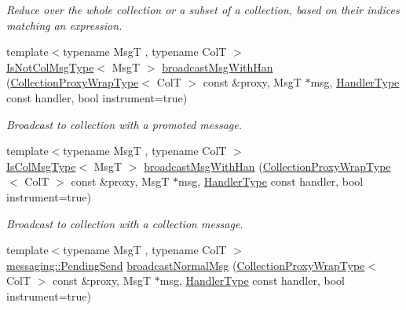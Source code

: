 \begin{DoxyCompactItemize}
\begin{DoxyCompactList}\small\item\em Reduce over the whole collection or a subset of a collection, based on their indices matching an expression. \end{DoxyCompactList}\item 
{\footnotesize template$<$typename MsgT , typename ColT $>$ }\\\hyperlink{structvt_1_1vrt_1_1collection_1_1_collection_manager_ae376deeefd4f89a0b1c93849977715d9}{Is\+Not\+Col\+Msg\+Type}$<$ MsgT $>$ \hyperlink{structvt_1_1vrt_1_1collection_1_1_collection_manager_a3b84dab30f231cc9a266ff323340f17e}{broadcast\+Msg\+With\+Han} (\hyperlink{structvt_1_1vrt_1_1collection_1_1_collection_manager_a56458ed7f9bb22b631b9b3a745f42f94}{Collection\+Proxy\+Wrap\+Type}$<$ ColT $>$ const \&proxy, MsgT $\ast$msg, \hyperlink{namespacevt_af64846b57dfcaf104da3ef6967917573}{Handler\+Type} const handler, bool instrument=true)
\begin{DoxyCompactList}\small\item\em Broadcast to collection with a promoted message. \end{DoxyCompactList}\item 
{\footnotesize template$<$typename MsgT , typename ColT $>$ }\\\hyperlink{structvt_1_1vrt_1_1collection_1_1_collection_manager_a21c21612c806016788057aeab142af20}{Is\+Col\+Msg\+Type}$<$ MsgT $>$ \hyperlink{structvt_1_1vrt_1_1collection_1_1_collection_manager_a17e6a23d781779e9d0e4fe068f73ac90}{broadcast\+Msg\+With\+Han} (\hyperlink{structvt_1_1vrt_1_1collection_1_1_collection_manager_a56458ed7f9bb22b631b9b3a745f42f94}{Collection\+Proxy\+Wrap\+Type}$<$ ColT $>$ const \&proxy, MsgT $\ast$msg, \hyperlink{namespacevt_af64846b57dfcaf104da3ef6967917573}{Handler\+Type} const handler, bool instrument=true)
\begin{DoxyCompactList}\small\item\em Broadcast to collection with a collection message. \end{DoxyCompactList}\item 
{\footnotesize template$<$typename MsgT , typename ColT $>$ }\\\hyperlink{structvt_1_1messaging_1_1_pending_send}{messaging\+::\+Pending\+Send} \hyperlink{structvt_1_1vrt_1_1collection_1_1_collection_manager_aa10f6bc4c1b886b78b22e0c9ca3805ef}{broadcast\+Normal\+Msg} (\hyperlink{structvt_1_1vrt_1_1collection_1_1_collection_manager_a56458ed7f9bb22b631b9b3a745f42f94}{Collection\+Proxy\+Wrap\+Type}$<$ ColT $>$ const \&proxy, MsgT $\ast$msg, \hyperlink{namespacevt_af64846b57dfcaf104da3ef6967917573}{Handler\+Type} const handler, bool instrument=true)

\end{DoxyCompactItemize}
